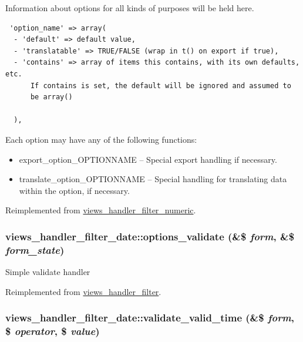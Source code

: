 Information about options for all kinds of purposes will be held here. 

\begin{Code}\begin{verbatim} 'option_name' => array(
  - 'default' => default value,
  - 'translatable' => TRUE/FALSE (wrap in t() on export if true),
  - 'contains' => array of items this contains, with its own defaults, etc.
      If contains is set, the default will be ignored and assumed to
      be array()

  ),
\end{verbatim}
\end{Code}

 Each option may have any of the following functions:\begin{itemize}
\item export\_\-option\_\-OPTIONNAME -- Special export handling if necessary.\item translate\_\-option\_\-OPTIONNAME -- Special handling for translating data within the option, if necessary. \end{itemize}


Reimplemented from \hyperlink{classviews__handler__filter__numeric_a6c2de73a4c7eda8575e1691b8218b3b}{views\_\-handler\_\-filter\_\-numeric}.\hypertarget{classviews__handler__filter__date_6d4e05f04a0f9ea5663f165777f54003}{
\subsubsection[{options\_\-validate}]{\setlength{\rightskip}{0pt plus 5cm}views\_\-handler\_\-filter\_\-date::options\_\-validate (\&\$ {\em form}, \/  \&\$ {\em form\_\-state})}}
\label{classviews__handler__filter__date_6d4e05f04a0f9ea5663f165777f54003}


Simple validate handler 

Reimplemented from \hyperlink{classviews__handler__filter_1156751e912662ce47ad680cbe2c03a3}{views\_\-handler\_\-filter}.\hypertarget{classviews__handler__filter__date_d19ed65f3335ed1ac6896fe17a480b4e}{
\subsubsection[{validate\_\-valid\_\-time}]{\setlength{\rightskip}{0pt plus 5cm}views\_\-handler\_\-filter\_\-date::validate\_\-valid\_\-time (\&\$ {\em form}, \/  \$ {\em operator}, \/  \$ {\em value})}}
\label{classviews__handler__filter__date_d19ed65f3335ed1ac6896fe17a480b4e}


